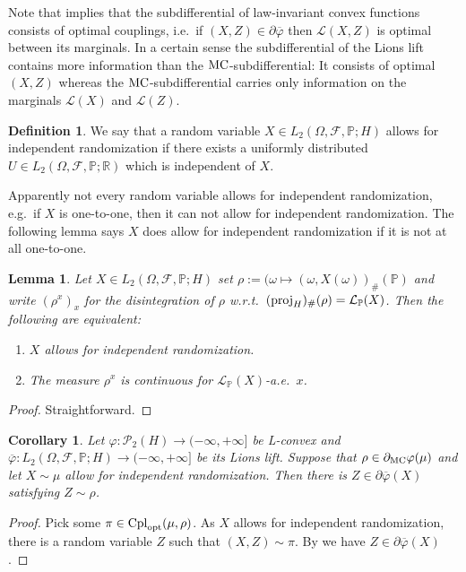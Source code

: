 \documentclass[a4paper]{amsart}
\numberwithin{theorem}{section}
\newtheorem{lemma}[theorem]{Lemma}
\newtheorem{corollary}[theorem]{Corollary}
\theoremstyle{definition}
\newtheorem{definition}[theorem]{Definition}
\newcommand{\R}{\mathbb{R}}
\newcommand{\F}{\mathcal{F}}
\newcommand{\proj}{\textup{proj}}
\newcommand{\law}{\mathcal{L}}
\newcommand{\cpl}{\textup{Cpl}}
\newcommand{\Pc}{\mathcal P}
\renewcommand{\P}{\mathbb{P}}
\newcommand{\cplopt}{\cpl_{\rm opt}}
\renewcommand{\H}{H}
\renewcommand{\phi}{\varphi}
\newcommand{\mc}{\textup{MC}}
\begin{document}
Note that  implies that the subdifferential of law-invariant convex functions consists of optimal couplings, i.e.\ if $(X,Z) \in \partial\overline{\phi}$ then $\law(X,Z)$ is optimal between its marginals. In a certain sense the subdifferential of the Lions lift contains more information than the $\mc$-subdifferential: It consists of optimal $(X,Z)$ whereas the $\mc$-subdifferential carries only information on the marginals $\law(X)$ and $\law(Z)$. 

\begin{definition}\label{def:IndRand}
    We say that a random variable $X\in L_2(\Omega, \F, \P;\H)$ allows for independent randomization if there exists a uniformly distributed $U\in L_2(\Omega, \F, \P;\R)$ which is independent of $X$.
\end{definition}
Apparently not every random variable allows for independent randomization, e.g.\ if $X$  is one-to-one, then it can not allow for independent randomization. 
The following lemma says $X$ does allow for independent randomization if it is not at all one-to-one.
\begin{lemma}\label{lem:IndRand=Not1-1}
   Let  $X\in L_2(\Omega, \F, \P;\H)$ set $\rho:=(\omega \mapsto (\omega, X(\omega))_{\#}(\P)$ and write $(\rho^x)_x$ for the disintegration of $\rho$ w.r.t.\ $(\proj_{\H})_{\#}(\rho)= \law_{\P}(X)$. Then the following are equivalent: 
   \begin{enumerate}
       \item $X$ allows for independent randomization.
       \item The measure $\rho^x$ is continuous for $\law_{\P}(X)$-a.e.\ $x$. 
   \end{enumerate}
\end{lemma}
\begin{proof}
    Straightforward.
\end{proof}


\begin{corollary}\label{cor:MCdiffToLdiff}
Let $\phi: \Pc_2(\H) \to (-\infty, +\infty]$ be L-convex and $\overline{\phi} : L_2(\Omega,\F,\P;\H) \to (-\infty, +\infty]$ be its Lions lift. Suppose that $\rho \in \partial_\mc\phi (\mu)$ and let $X \sim \mu$ allow for independent randomization. Then there is $Z \in \partial\overline{\phi}(X)$ satisfying $Z \sim \rho$. 
\end{corollary}
\begin{proof}
Pick some $\pi \in \cplopt(\mu,\rho)$. As $X$ allows for independent randomization, there is a random variable $Z$ such that $(X,Z) \sim \pi$. By  we have $Z \in \partial\overline{\phi}(X)$.
\end{proof}
\end{document}
